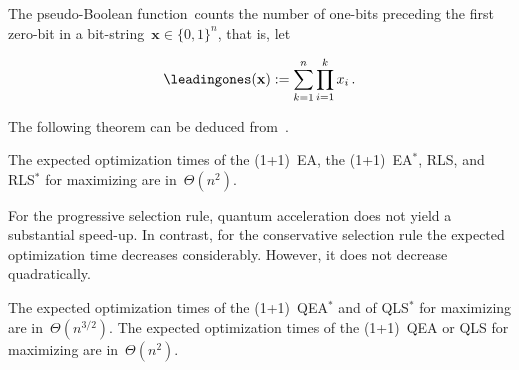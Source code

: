 The pseudo-Boolean function~\leadingones counts the number of one-bits
preceding the first zero-bit in a bit-string~$\mathbf{x}\in\{0,1\}^n$,
that is, let

\begin{equation}
\leadingones(\mathbf{x}):=\sum_{k=1}^n\prod_{i=1}^k x_i\,.
\end{equation}


The following theorem can be deduced from~\cite{DJWoneone}.

\begin{theorem}
  The expected optimization times of the (1+1)~EA, the (1+1)~EA$^*$,
  RLS, and RLS$^*$ for maximizing \leadingones are in~$\Theta(n^2)$.
\end{theorem}

For the progressive selection rule, quantum acceleration does not yield
a substantial speed-up. In contrast, for the conservative selection
rule the expected optimization time decreases considerably. However,
it does not decrease quadratically.

\begin{theorem}
  The expected optimization times of the (1+1)~QEA$^*$ and of QLS$^*$
  for maximizing \leadingones are in~$\Theta(n^{3/2})$.  The expected
  optimization times of the (1+1)~QEA or QLS for maximizing
  \leadingones are in~$\Theta(n^{2})$.
\end{theorem}

